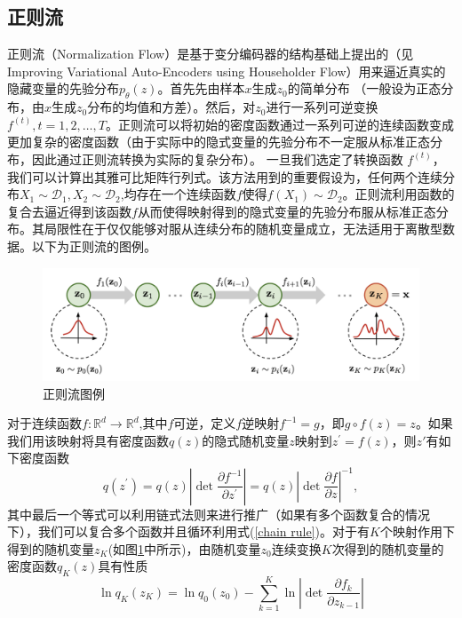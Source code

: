 \subsection{正则流}
正则流（Normalization Flow）是基于变分编码器的结构基础上提出的（见Improving Variational Auto-Encoders
using Householder Flow）用来逼近真实的隐藏变量的先验分布$p_{\theta}(z)$。首先先由样本$x$生成$z_0$的简单分布
（一般设为正态分布，由$x$生成$z_0$分布的均值和方差）。然后，对$z_0$进行一系列可逆变换$f^{(t)},t=1,2,\dots,T$。正则流可以将初始的密度函数通过一系列可逆的连续函数变成更加复杂的密度函数（由于实际中的隐式变量的先验分布不一定服从标准正态分布，因此通过正则流转换为实际的复杂分布）。 一旦我们选定了转换函数
$f^{(t)}$， 我们可以计算出其雅可比矩阵行列式。该方法用到的重要假设为，任何两个连续分布$X_1\sim \mathcal{D}_1,X_2\sim \mathcal{D}_2$,均存在一个连续函数$f$使得$f(X_1)\sim \mathcal{D_2}$。正则流利用函数的复合去逼近得到该函数$f$从而使得映射得到的隐式变量的先验分布服从标准正态分布。其局限性在于仅仅能够对服从连续分布的随机变量成立，无法适用于离散型数据。以下为正则流的图例。
\begin{figure}[H]
    \centering
    \includegraphics[scale=0.15]{ThuThesis_ Tsinghua University Thesis LaTeX Template/Picture/norm_flow.png}
    \caption{正则流图例}
    \label{Norm_flow}
\end{figure}
对于连续函数$f:\mathbb{R}^{d}\rightarrow \mathbb{R}^d$,其中$f$可逆，定义$f$逆映射$f^{-1}=g$，即$g\circ f(z)=z$。如果我们用该映射将具有密度函数$q(z)$的隐式随机变量$z$映射到$z^{\prime}=f(z)$，则$z'$有如下密度函数
\begin{equation}
    q(z^{\prime}) = q(z)|\operatorname{det}\frac{\partial f^{-1}}{\partial z^{\prime}}|= q(z)|\operatorname{det}\frac{\partial f}{\partial z}|^{-1},
    \label{chain rule}
\end{equation}
其中最后一个等式可以利用链式法则来进行推广（如果有多个函数复合的情况下），我们可以复合多个函数并且循环利用式(\ref{chain rule})。对于有$K$个映射作用下得到的随机变量$z_{K}$(如图\ref{Norm_flow}中所示)，由随机变量$z_0$连续变换$K$次得到的随机变量的密度函数$q_{K}(z)$具有性质
\begin{equation}
    \ln q_{K}(z_{K}) = \ln q_{0}(z_0)-\sum_{k=1}^{K}\ln |\operatorname{det}\frac{\partial f_k}{\partial z_{k-1}}|
    \label{chain log likelihood}
\end{equation}
